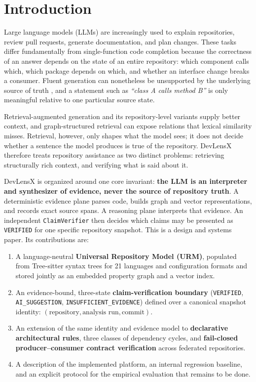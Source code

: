 \documentclass[runningheads]{llncs}
\begin{document}
\section{Introduction}
Large language models (LLMs) are increasingly used to explain repositories, review pull requests, generate documentation, and plan changes. These tasks differ fundamentally from single-function code completion because the correctness of an answer depends on the state of an entire repository: which component calls which, which package depends on which, and whether an interface change breaks a consumer. Fluent generation can nonetheless be unsupported by the underlying source of truth \cite{ji2023survey}, and a statement such as \textit{``class A calls method B''} is only meaningful relative to one particular source state.

Retrieval-augmented generation \cite{lewis2020rag} and its repository-level variants \cite{zhang2023repocoder} supply better context, and graph-structured retrieval \cite{edge2024graphrag} can expose relations that lexical similarity misses. Retrieval, however, only shapes what the model sees; it does not decide whether a sentence the model produces is true of the repository. DevLensX therefore treats repository assistance as two distinct problems: retrieving structurally rich context, and verifying what is said about it.

DevLensX is organized around one core invariant: \textbf{the LLM is an interpreter and synthesizer of evidence, never the source of repository truth}. A deterministic evidence plane parses code, builds graph and vector representations, and records exact source spans. A reasoning plane interprets that evidence. An independent \texttt{ClaimVerifier} then decides which claims may be presented as \texttt{VERIFIED} for one specific repository snapshot. This is a design and systems paper. Its contributions are:
\begin{enumerate}
    \item A language-neutral \textbf{Universal Repository Model (URM)}, populated from Tree-sitter syntax trees for 21 languages and configuration formats and stored jointly as an embedded property graph and a vector index.
    \item An evidence-bound, three-state \textbf{claim-verification boundary} (\texttt{VERIFIED}, \texttt{AI\_SUGGESTION}, \texttt{INSUFFICIENT\_EVIDENCE}) defined over a canonical snapshot identity: $(\text{repository}, \text{analysis run}, \text{commit})$.
    \item An extension of the same identity and evidence model to \textbf{declarative architectural rules}, three classes of dependency cycles, and \textbf{fail-closed producer--consumer contract verification} across federated repositories.
    \item A description of the implemented platform, an internal regression baseline, and an explicit protocol for the empirical evaluation that remains to be done.
\end{enumerate}
\end{document}
